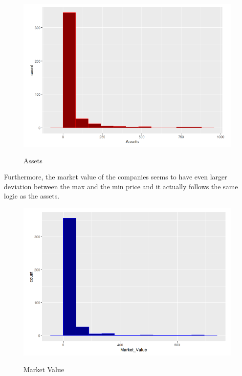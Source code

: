 \documentclass{book}
\begin{document}
\begin{figure}[H]
\centering
\caption{Assets}
\begin{center}
\includegraphics[scale=0.35]{../R/photos/4_2_assets.png}  \\
\end{center}
\end{figure}
Furthermore, the market value of the companies seems to have even larger deviation between the max and the min price and it actually follows the same logic as the assets.\\
\begin{figure}[H]
\centering
\caption{Market Value}
\begin{center}
\includegraphics[scale=0.35]{../R/photos/4_2_market_value.png}  \\
\end{center}
\end{figure}
\end{document}
